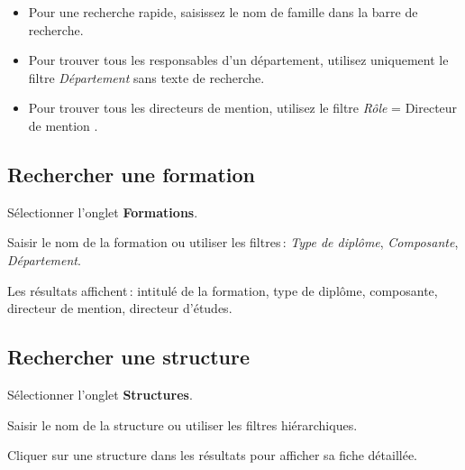 \begin{tipbox}
  \begin{itemize}
    \item Pour une recherche rapide, saisissez le nom de famille dans la barre de recherche.
    \item Pour trouver tous les responsables d'un d\'epartement, utilisez uniquement le filtre \textit{D\'epartement} sans texte de recherche.
    \item Pour trouver tous les directeurs de mention, utilisez le filtre \textit{R\^ole} = \og Directeur de mention \fg{}.
  \end{itemize}
\end{tipbox}

\subsection{Rechercher une formation}

\begin{steps}
  \item S\'electionner l'onglet \textbf{Formations}.
  \item Saisir le nom de la formation ou utiliser les filtres\,: \textit{Type de dipl\^ome}, \textit{Composante}, \textit{D\'epartement}.
  \item Les r\'esultats affichent\,: intitul\'e de la formation, type de dipl\^ome, composante, directeur de mention, directeur d'\'etudes.
\end{steps}


\subsection{Rechercher une structure}

\begin{steps}
  \item S\'electionner l'onglet \textbf{Structures}.
  \item Saisir le nom de la structure ou utiliser les filtres hi\'erarchiques.
  \item Cliquer sur une structure dans les r\'esultats pour afficher sa fiche d\'etaill\'ee.
\end{steps}

